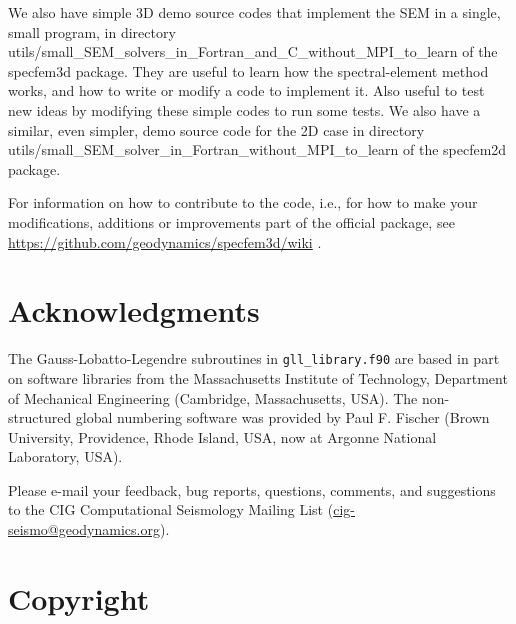 \documentclass[oneside,english,onecolumn,letterpaper]{book}
\newcommand{\urlwithparentheses}[1]{(\url{#1})}
\begin{document}
\noindent We also have simple 3D demo source codes that implement the SEM in a single, small program, in directory\\
utils/small\_SEM\_solvers\_in\_Fortran\_and\_C\_without\_MPI\_to\_learn of the specfem3d package.
They are useful to learn how the spectral-element method works, and how to write or modify a code to implement it.
Also useful to test new ideas by modifying these simple codes to run some tests.
We also have a similar, even simpler, demo source code for the 2D case in directory\\
utils/small\_SEM\_solver\_in\_Fortran\_without\_MPI\_to\_learn of the specfem2d package.

\noindent For information on how to contribute to the code, i.e., for how to make your modifications, additions or improvements part of the
official package, see \url{https://github.com/geodynamics/specfem3d/wiki} .


\chapter*{Acknowledgments}


The Gauss-Lobatto-Legendre subroutines in \texttt{gll\_library.f90}
are based in part on software libraries from the Massachusetts Institute
of Technology, Department of Mechanical Engineering (Cambridge, Massachusetts, USA).
The non-structured global numbering software was provided by Paul
F. Fischer (Brown University, Providence, Rhode Island, USA, now at Argonne National Laboratory, USA).

Please e-mail your feedback, bug reports, questions, comments, and suggestions
to the CIG Computational Seismology Mailing List \urlwithparentheses{cig-seismo@geodynamics.org}.



\chapter*{Copyright}

\end{document}

